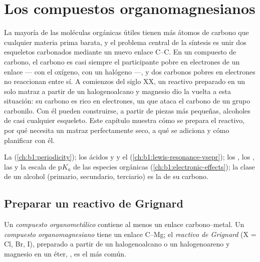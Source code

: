 \chapter{Los compuestos organomagnesianos}\label{ch:b1:organomagnesium}

La mayoría de las moléculas orgánicas útiles tienen más átomos de carbono
que cualquier materia prima barata, y el problema central de la síntesis
es unir dos esqueletos carbonados mediante un nuevo enlace C--C. En un
compuesto de carbono, el carbono es casi siempre el participante pobre
en electrones de un enlace --- con el oxígeno, con un halógeno ---, y dos
carbonos pobres en electrones no reaccionan entre sí. A comienzos del
siglo XX, un reactivo preparado en un solo matraz a partir de un
halogenoalcano y magnesio dio la vuelta a esta situación: su carbono es
rico en electrones, un  que ataca el carbono de un grupo
carbonilo. Con él pueden construirse, a partir de piezas más pequeñas,
alcoholes de casi cualquier esqueleto. Este capítulo muestra cómo se
prepara el reactivo, por qué necesita un matraz perfectamente seco, a qué
se adiciona y cómo planificar con él.

\begin{recall}
La  (\cref{ch:b1:periodicity}); los ácidos y  y el  (\cref{ch:b1:lewis-resonance-vsepr}); los
, los , las  y la escala de
$\mathrm{p}K_a$ de las especies orgánicas (\cref{ch:b1:electronic-effects});
la clase de un alcohol (primario, secundario, terciario) es la de su
carbono.
\end{recall}

\section{Preparar un reactivo de Grignard}

\begin{definition}\label{def:b1:organomagnesium:organometallic}
Un \emph{compuesto organometálico} contiene al
menos un enlace carbono--metal. Un \emph{compuesto
organomagnesiano} tiene un enlace C--Mg;
el \emph{reactivo de Grignard} 
(X = Cl, Br, I), preparado a partir de un halogenoalcano o un
halogenoareno y magnesio en un éter, , es el más
común.
\end{definition}

